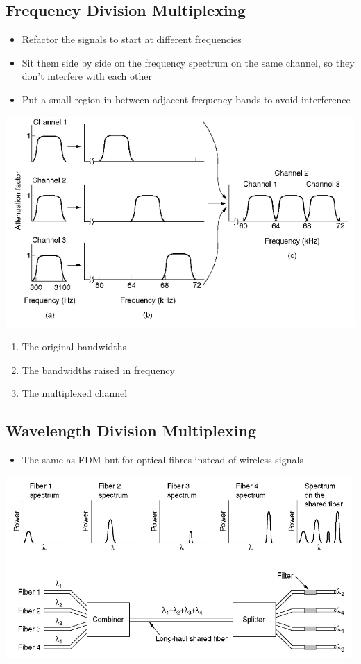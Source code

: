 \documentclass{article}[18pt]
\begin{document}
\subsection{Frequency Division Multiplexing}
\begin{itemize}
	\item Refactor the signals to start at different frequencies
	\item Sit them side by side on the frequency spectrum on the same channel, so they don't interfere with each other
	\item Put a small region in-between adjacent frequency bands to avoid interference
\end{itemize}
\begin{center}
	\includegraphics[scale=0.7]{FDM}
\end{center}
\begin{enumerate}[label=\alph*]
	\item The original bandwidths
	\item The bandwidths raised in frequency
	\item The multiplexed channel
\end{enumerate}
\subsection{Wavelength Division Multiplexing}
\begin{itemize}
	\item The same as FDM but for optical fibres instead of wireless signals
\end{itemize}
\begin{center}
	\includegraphics[scale=0.7]{WDM}
\end{center}
\end{document}
